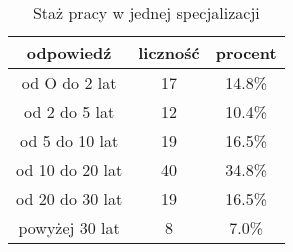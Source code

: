 \begin{table}[H]
\caption{Staż pracy w jednej specjalizacji}
\centering
\begin{tabular}{ | c | c | c |}
\hline
odpowiedź & liczność & procent\\
\hline
od O do 2 lat  &  17  & 14.8\% \\
\hline
od 2 do 5 lat  &  12  & 10.4\% \\
\hline
od 5 do 10 lat  &  19  & 16.5\% \\
\hline
od 10 do 20 lat  &  40  & 34.8\% \\
\hline
od 20 do 30 lat  &  19  & 16.5\% \\
\hline
powyżej 30 lat  &  8  & 7.0\% \\
\hline
\end{tabular}
\label{tab:Q6}
\end{table}